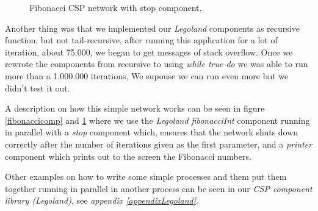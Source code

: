 \documentclass[a4paper,12pt]{article}
\begin{document}
\begin{figure}[h]
  \begin{center}
  \end{center}
  \caption{Fibonacci CSP network with stop component.}
  \label{fibonacci}
\end{figure}

Another thing was that we implemented our {\it Legoland} components as
recursive function, but not tail-recursive, after running this application
for a lot of iteration, about 75.000, we began to get messages of stack
overflow. Once we rewrote the components from recursive to using {\it while true
do} we was able to run more than a 1.000.000 iterations, We supouse we can
run even more but we didn't test it out.

A description on how this simple network works can be seen in figure
\ref{fibonaccicomp} and \ref{fibonacci} where we use the {\it Legoland
fibonacciInt} component running in parallel with a {\it stop} component which,
ensures that the network shuts down correctly after the number of iterations
given as the first parameter, and a {\it printer} component which prints out to
the screen the Fibonacci numbers.

Other examples on how to write some simple processes and them put them together
running in parallel in another process can be seen in our {\it CSP component 
library (Legoland)}, see  {\it appendix \ref{appendixLegoland}}.
\end{document}
